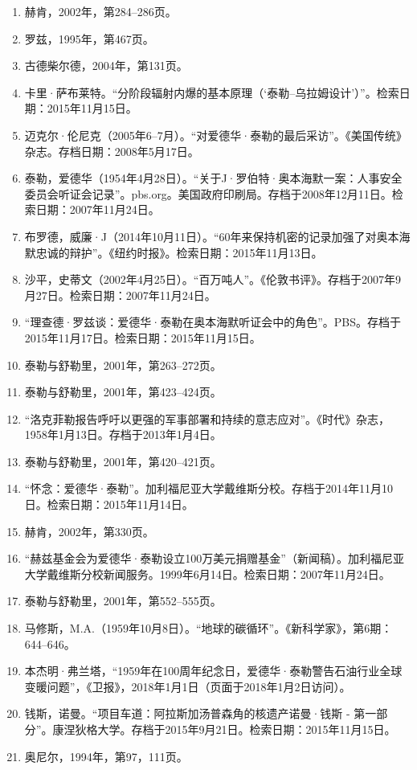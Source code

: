 \begin{enumerate}
\item 赫肯，2002年，第284–286页。
\item 罗兹，1995年，第467页。
\item 古德柴尔德，2004年，第131页。
\item 卡里·萨布莱特。“分阶段辐射内爆的基本原理（‘泰勒–乌拉姆设计’）”。检索日期：2015年11月15日。
\item 迈克尔·伦尼克（2005年6–7月）。“对爱德华·泰勒的最后采访”。《美国传统》杂志。存档日期：2008年5月17日。
\item 泰勒，爱德华（1954年4月28日）。“关于J·罗伯特·奥本海默一案：人事安全委员会听证会记录”。pbs.org。美国政府印刷局。存档于2008年12月11日。检索日期：2007年11月24日。
\item 布罗德，威廉·J（2014年10月11日）。“60年来保持机密的记录加强了对奥本海默忠诚的辩护”。《纽约时报》。检索日期：2015年11月13日。
\item 沙平，史蒂文（2002年4月25日）。“百万吨人”。《伦敦书评》。存档于2007年9月27日。检索日期：2007年11月24日。
\item “理查德·罗兹谈：爱德华·泰勒在奥本海默听证会中的角色”。PBS。存档于2015年11月17日。检索日期：2015年11月15日。
\item 泰勒与舒勒里，2001年，第263–272页。
\item 泰勒与舒勒里，2001年，第423–424页。
\item “洛克菲勒报告呼吁以更强的军事部署和持续的意志应对”。《时代》杂志，1958年1月13日。存档于2013年1月4日。
\item 泰勒与舒勒里，2001年，第420–421页。
\item “怀念：爱德华·泰勒”。加利福尼亚大学戴维斯分校。存档于2014年11月10日。检索日期：2015年11月14日。
\item 赫肯，2002年，第330页。
\item “赫兹基金会为爱德华·泰勒设立100万美元捐赠基金”（新闻稿）。加利福尼亚大学戴维斯分校新闻服务。1999年6月14日。检索日期：2007年11月24日。
\item 泰勒与舒勒里，2001年，第552–555页。
\item 马修斯，M.A.（1959年10月8日）。“地球的碳循环”。《新科学家》，第6期：644–646。
\item 本杰明·弗兰塔，“1959年在100周年纪念日，爱德华·泰勒警告石油行业全球变暖问题”，《卫报》，2018年1月1日（页面于2018年1月2日访问）。
\item 钱斯，诺曼。“项目车道：阿拉斯加汤普森角的核遗产诺曼·钱斯 - 第一部分”。康涅狄格大学。存档于2015年9月21日。检索日期：2015年11月15日。
\item 奥尼尔，1994年，第97，111页。

\end{enumerate}
